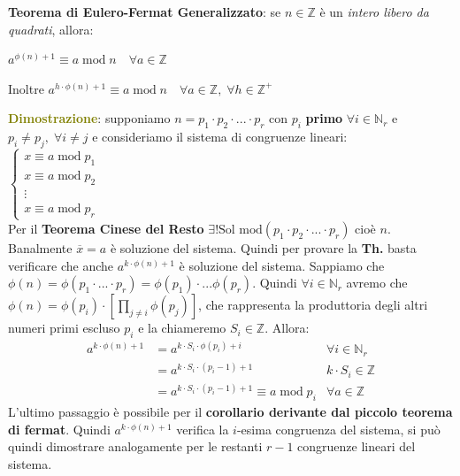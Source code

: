 \newpage
\begin{flushleft}
    \textbf{Teorema di Eulero-Fermat Generalizzato}: se $n \in \mathbb{Z}$ è un \textit{intero libero da quadrati}, allora:

    {\centering
        $a^{\phi(n) + 1} \equiv a \; \text{mod} \; n \quad \forall a \in \mathbb{Z}$
    \par}
    Inoltre $a^{h \cdot \phi(n) + 1} \equiv a \; \text{mod} \; n \quad \forall a \in \mathbb{Z}, \; \forall h \in \mathbb{Z}^+$

    \begin{boxA}
        \textcolor{olive}{\textbf{Dimostrazione}}: supponiamo $n = p_1 \cdot p_2 \cdot ... \cdot p_r$ con $p_i$ \textbf{primo} $\forall i \in \mathbb{N}_r$ e $p_i \neq p_j, \; \forall i \neq j$ e consideriamo il sistema di congruenze lineari: \\
        $\begin{cases}
            x \equiv a \; \text{mod} \; p_1 \\
            x \equiv a \; \text{mod} \; p_2 \\
            \vdots \\
            x \equiv a \; \text{mod} \; p_r
        \end{cases}$ \\
        Per il \textbf{Teorema Cinese del Resto} $\exists ! \text{Sol mod}(p_1 \cdot p_2 \cdot ... \cdot p_r)$ cioè $n$. Banalmente $\overline{x} = a$ è soluzione del sistema. Quindi per provare la \textbf{Th.} basta verificare che anche $a^{k \cdot \phi(n) + 1}$ è soluzione del sistema. Sappiamo che $\phi(n) = \phi(p_1 \cdot ... \cdot p_r) = \phi(p_1) \cdot ... \phi(p_r)$. Quindi $\forall i \in \mathbb{N}_r$ avremo che $\phi(n) = \phi(p_i) \cdot [\underset{j \neq i}{\prod}\phi(p_j)]$, che rappresenta la produttoria degli altri numeri primi escluso $p_i$ e la chiameremo $S_i \in \mathbb{Z}$. Allora:
        \begin{align*}
            a^{k \cdot \phi(n) + 1} &= a^{k \cdot S_i \cdot \phi(p_i) + i} & \forall i \in \mathbb{N}_r \\
            &= a^{k \cdot S_i \cdot (p_i - 1) + 1} & k \cdot S_i \in \mathbb{Z} \\
            &= a^{k \cdot S_i \cdot (p_i - 1) + 1} \equiv a \; \text{mod} \; p_i & \forall a \in \mathbb{Z}
        \end{align*}
        L'ultimo passaggio è possibile per il \textbf{corollario derivante dal piccolo teorema di fermat}. Quindi $a^{k \cdot \phi(n) + 1}$ verifica la $i$-esima congruenza del sistema, si può quindi dimostrare analogamente per le restanti $r - 1$ congruenze lineari del sistema.
    \end{boxA}
\end{flushleft}

